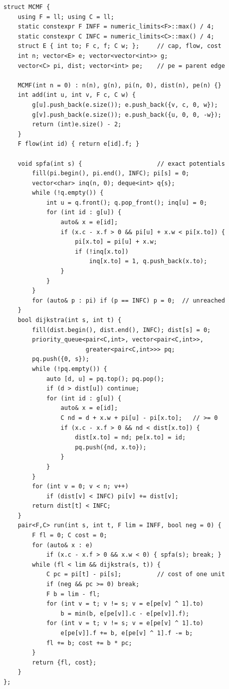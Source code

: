 \begin{lstlisting}
struct MCMF {
    using F = ll; using C = ll;
    static constexpr F INFF = numeric_limits<F>::max() / 4;
    static constexpr C INFC = numeric_limits<C>::max() / 4;
    struct E { int to; F c, f; C w; };     // cap, flow, cost
    int n; vector<E> e; vector<vector<int>> g;
    vector<C> pi, dist; vector<int> pe;    // pe = parent edge

    MCMF(int n = 0) : n(n), g(n), pi(n, 0), dist(n), pe(n) {}
    int add(int u, int v, F c, C w) {
        g[u].push_back(e.size()); e.push_back({v, c, 0, w});
        g[v].push_back(e.size()); e.push_back({u, 0, 0, -w});
        return (int)e.size() - 2;
    }
    F flow(int id) { return e[id].f; }

    void spfa(int s) {                     // exact potentials
        fill(pi.begin(), pi.end(), INFC); pi[s] = 0;
        vector<char> inq(n, 0); deque<int> q{s};
        while (!q.empty()) {
            int u = q.front(); q.pop_front(); inq[u] = 0;
            for (int id : g[u]) {
                auto& x = e[id];
                if (x.c - x.f > 0 && pi[u] + x.w < pi[x.to]) {
                    pi[x.to] = pi[u] + x.w;
                    if (!inq[x.to])
                        inq[x.to] = 1, q.push_back(x.to);
                }
            }
        }
        for (auto& p : pi) if (p == INFC) p = 0;  // unreached
    }
    bool dijkstra(int s, int t) {
        fill(dist.begin(), dist.end(), INFC); dist[s] = 0;
        priority_queue<pair<C,int>, vector<pair<C,int>>,
                       greater<pair<C,int>>> pq;
        pq.push({0, s});
        while (!pq.empty()) {
            auto [d, u] = pq.top(); pq.pop();
            if (d > dist[u]) continue;
            for (int id : g[u]) {
                auto& x = e[id];
                C nd = d + x.w + pi[u] - pi[x.to];   // >= 0
                if (x.c - x.f > 0 && nd < dist[x.to]) {
                    dist[x.to] = nd; pe[x.to] = id;
                    pq.push({nd, x.to});
                }
            }
        }
        for (int v = 0; v < n; v++)
            if (dist[v] < INFC) pi[v] += dist[v];
        return dist[t] < INFC;
    }
    pair<F,C> run(int s, int t, F lim = INFF, bool neg = 0) {
        F fl = 0; C cost = 0;
        for (auto& x : e)
            if (x.c - x.f > 0 && x.w < 0) { spfa(s); break; }
        while (fl < lim && dijkstra(s, t)) {
            C pc = pi[t] - pi[s];          // cost of one unit
            if (neg && pc >= 0) break;
            F b = lim - fl;
            for (int v = t; v != s; v = e[pe[v] ^ 1].to)
                b = min(b, e[pe[v]].c - e[pe[v]].f);
            for (int v = t; v != s; v = e[pe[v] ^ 1].to)
                e[pe[v]].f += b, e[pe[v] ^ 1].f -= b;
            fl += b; cost += b * pc;
        }
        return {fl, cost};
    }
};
\end{lstlisting}

